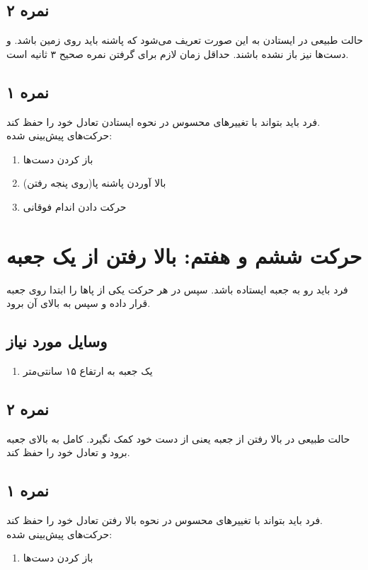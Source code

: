 \documentclass[12pt]{report}
\begin{document}
	\subsection*{نمره ۲}
	حالت طبیعی در ایستادن به این صورت تعریف می‌شود که پاشنه‌ باید روی زمین باشد. و دست‌ها نیز باز نشده باشند. حداقل زمان لازم برای گرفتن نمره صحیح ۳ ثانیه است.
	\subsection*{نمره ۱}
	فرد باید بتواند با تغییر‌های محسوس در نحوه ایستادن تعادل خود را حفظ کند.\\
	حرکت‌های پیش‌بینی شده:
	\begin{enumerate}
		\item باز کردن دست‌ها
		\item بالا آوردن پاشنه پا(روی پنجه رفتن)
		\item حرکت دادن اندام فوقانی
	\end{enumerate}
	\newpage
	
	\section*{حرکت ششم و هفتم: بالا رفتن از یک جعبه}
	فرد باید رو به جعبه ایستاده باشد. سپس در هر حرکت یکی از پاها را ابتدا روی جعبه قرار داده و سپس به بالای آن برود.
	\subsection*{وسایل مورد نیاز}
	\begin{enumerate}
		\item یک جعبه به ارتفاع ۱۵ سانتی‌متر
	\end{enumerate}
	\subsection*{نمره ۲}
	حالت طبیعی در بالا رفتن از جعبه یعنی از دست خود کمک نگیرد. کامل به بالای جعبه برود و تعادل خود را حفظ کند.
	\subsection*{نمره ۱}
	فرد باید بتواند با تغییر‌های محسوس در نحوه بالا رفتن تعادل خود را حفظ کند.\\
	حرکت‌های پیش‌بینی شده:
	\begin{enumerate}
		\item باز کردن دست‌ها
	\end{enumerate}
	\newpage
	
\end{document}
